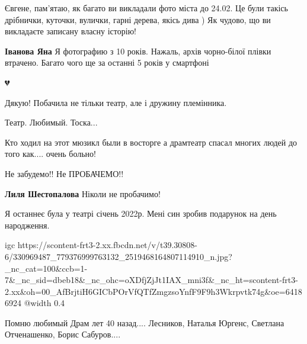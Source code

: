  
 
 
 
 

\qqSecCmt


Євгене, пам'ятаю, як багато ви викладали фото міста до 24.02. Це були такісь
дрібнички, куточки, вулички, гарні дерева, якісь дива ) Як чудово, що ви
викладаєте записану власну історію!

\begin{itemize} %
\textbf{Іванова Яна} Я фотографию з 10 років. Нажаль, архів чорно-білої плівки втрачено. Багато чого ще за останні 5 років у смартфоні
\end{itemize} %


💔


Дякую! Побачила не тільки театр, але і дружину племінника. 💐


Театр. Любимый. Тоска...


Кто ходил на этот мюзикл были в восторге а драмтеатр спасал многих людей до того как.... очень больно!


Не забудемо!! Не ПРОБАЧЕМО!!

\begin{itemize} %
\textbf{Лиля Шестопалова} Ніколи не пробачимо!
\end{itemize} %


Я останнеє була у театрі січень 2022р. Мені син зробив подарунок на день народження.

\ifcmt
  igc https://scontent-frt3-2.xx.fbcdn.net/v/t39.30808-6/330969487_779376999763132_2519468164807114910_n.jpg?_nc_cat=100&ccb=1-7&_nc_sid=dbeb18&_nc_ohc=oXDfjZjJt1IAX_mni3f&_nc_ht=scontent-frt3-2.xx&oh=00_AfBrjtiH6GICbPOrVfQTfZmgzsoYnfF9F9h3Wkrpvtk74g&oe=64186924
	@width 0.4
\fi


Помню любимый Драм лет 40 назад.... Лесников, Наталья Юргенс, Светлана Отченашенко, Борис Сабуров....
